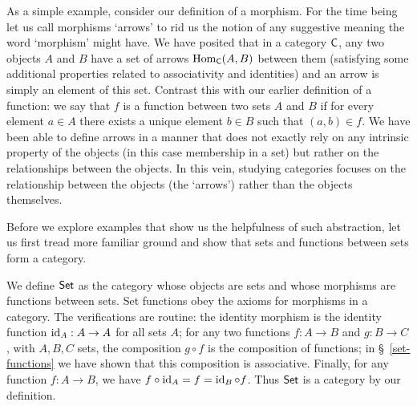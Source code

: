 As a simple example, consider our definition of a morphism. For the time being
let us call morphisms `arrows' to rid us the notion of any suggestive meaning
the word `morphism' might have. We have posited that in a category \(\mathsf{C}\),
any two objects \(A\) and \(B\) have a set of arrows \(\operatorname{Hom}_{\mathsf{C}}(A, B)\)
between them (satisfying some additional properties related to associativity and
identities) and an arrow is simply an element of this set. Contrast this with
our earlier definition of a function: we say that \(f\) is a function between
two sets \(A\) and \(B\) if for every element \(a \in A\) there exists a unique
element \(b \in B\) such that \((a, b) \in f\). We have been able to define
arrows in a manner that does not exactly rely on any intrinsic property of the
objects (in this case membership in a set) but rather on the relationships
between the objects. In this vein, studying categories focuses on the
relationship between the objects (the `arrows') rather than the objects
themselves.

Before we explore examples that show us the helpfulness of such abstraction, let
us first tread more familiar ground and show that sets and functions between
sets form a category.

\begin{example}
    We define \(\mathsf{Set}\) as the category whose objects are sets and whose
    morphisms are functions between sets. Set functions obey the axioms for
    morphisms in a category. The verifications are routine: the identity
    morphism is the identity function \(\operatorname{id}_A : A \to A\) for all sets \(A\);
    for any two functions \(f: A \to B\) and \(g: B \to C\), with \(A, B, C\)
    sets, the composition \(g \circ f\) is the composition of functions; in
    \S~\ref{set-functions} we have shown that this composition is associative.
    Finally, for any function \(f: A \to B\), we have \(f \circ \operatorname{id}_A = f =
    \operatorname{id}_B \circ f\). Thus \(\mathsf{Set}\) is a category by our definition.
\end{example}

